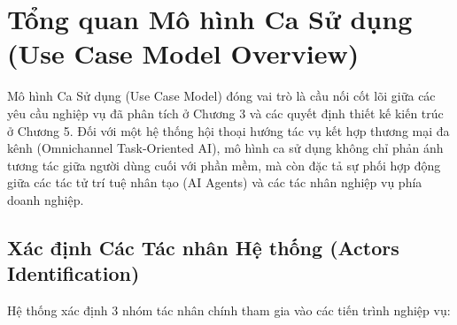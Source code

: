 \section{Tổng quan Mô hình Ca Sử dụng (Use Case Model Overview)}
\label{sec:tong_quan_use_case}

Mô hình Ca Sử dụng (Use Case Model) đóng vai trò là cầu nối cốt lõi giữa các yêu cầu nghiệp vụ đã phân tích ở Chương 3 và các quyết định thiết kế kiến trúc ở Chương 5. Đối với một hệ thống hội thoại hướng tác vụ kết hợp thương mại đa kênh (Omnichannel Task-Oriented AI), mô hình ca sử dụng không chỉ phản ánh tương tác giữa người dùng cuối với phần mềm, mà còn đặc tả sự phối hợp động giữa các tác tử trí tuệ nhân tạo (AI Agents) và các tác nhân nghiệp vụ phía doanh nghiệp.

\subsection{Xác định Các Tác nhân Hệ thống (Actors Identification)}
\label{subsec:actors_identification}

Hệ thống xác định 3 nhóm tác nhân chính tham gia vào các tiến trình nghiệp vụ:

